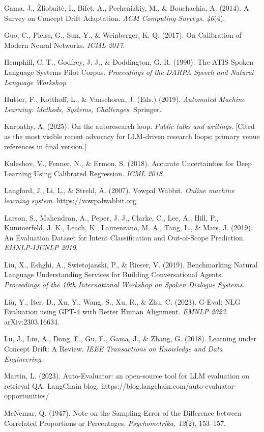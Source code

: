 Gama, J., Žliobaitė, I., Bifet, A., Pechenizkiy, M., \& Bouchachia, A.
(2014). A Survey on Concept Drift Adaptation. \emph{ACM Computing
Surveys, 46}(4).

Guo, C., Pleiss, G., Sun, Y., \& Weinberger, K. Q. (2017). On
Calibration of Modern Neural Networks. \emph{ICML 2017}.

Hemphill, C. T., Godfrey, J. J., \& Doddington, G. R. (1990). The ATIS
Spoken Language Systems Pilot Corpus. \emph{Proceedings of the DARPA
Speech and Natural Language Workshop}.

Hutter, F., Kotthoff, L., \& Vanschoren, J. (Eds.) (2019).
\emph{Automated Machine Learning: Methods, Systems, Challenges}.
Springer.

Karpathy, A. (2025). On the autoresearch loop. \emph{Public talks and
writings}. {[}Cited as the most visible recent advocacy for LLM-driven
research loops; primary venue references in final version.{]}

Kuleshov, V., Fenner, N., \& Ermon, S. (2018). Accurate Uncertainties
for Deep Learning Using Calibrated Regression. \emph{ICML 2018}.

Langford, J., Li, L., \& Strehl, A. (2007). Vowpal Wabbit. \emph{Online
machine learning system}. https://vowpalwabbit.org

Larson, S., Mahendran, A., Peper, J. J., Clarke, C., Lee, A., Hill, P.,
Kummerfeld, J. K., Leach, K., Laurenzano, M. A., Tang, L., \& Mars, J.
(2019). An Evaluation Dataset for Intent Classification and Out-of-Scope
Prediction. \emph{EMNLP-IJCNLP 2019}.

Liu, X., Eshghi, A., Swietojanski, P., \& Rieser, V. (2019).
Benchmarking Natural Language Understanding Services for Building
Conversational Agents. \emph{Proceedings of the 10th International
Workshop on Spoken Dialogue Systems}.

Liu, Y., Iter, D., Xu, Y., Wang, S., Xu, R., \& Zhu, C. (2023). G-Eval:
NLG Evaluation using GPT-4 with Better Human Alignment. \emph{EMNLP
2023}. arXiv:2303.16634.

Lu, J., Liu, A., Dong, F., Gu, F., Gama, J., \& Zhang, G. (2018).
Learning under Concept Drift: A Review. \emph{IEEE Transactions on
Knowledge and Data Engineering}.

Martin, L. (2023). Auto-Evaluator: an open-source tool for LLM
evaluation on retrieval QA. LangChain blog.
https://blog.langchain.com/auto-evaluator-opportunities/

McNemar, Q. (1947). Note on the Sampling Error of the Difference between
Correlated Proportions or Percentages. \emph{Psychometrika, 12}(2),
153--157.


